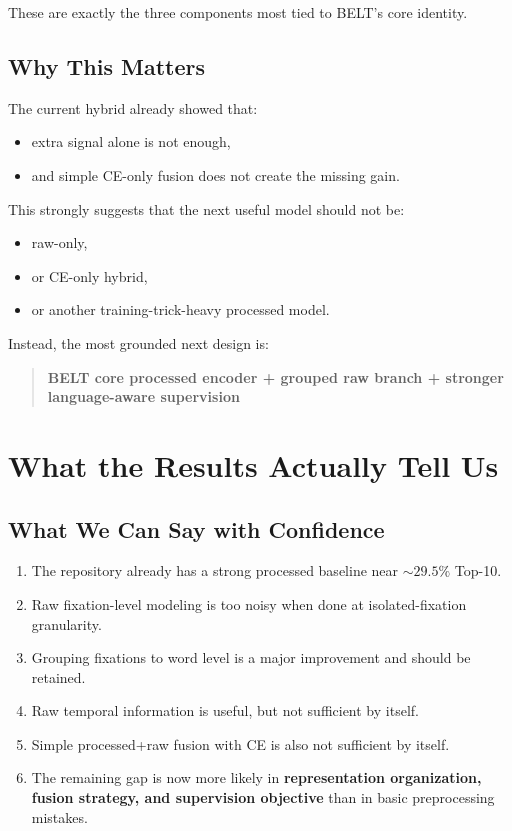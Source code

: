 \documentclass[11pt]{article}
\begin{document}
These are exactly the three components most tied to BELT's core identity.

\subsection{Why This Matters}

The current hybrid already showed that:
\begin{itemize}
    \item extra signal alone is not enough,
    \item and simple CE-only fusion does not create the missing gain.
\end{itemize}

This strongly suggests that the next useful model should not be:
\begin{itemize}
    \item raw-only,
    \item or CE-only hybrid,
    \item or another training-trick-heavy processed model.
\end{itemize}

Instead, the most grounded next design is:
\begin{quote}
\textbf{BELT core processed encoder + grouped raw branch + stronger language-aware supervision}
\end{quote}

\section{What the Results Actually Tell Us}

\subsection{What We Can Say with Confidence}

\begin{enumerate}
    \item The repository already has a strong processed baseline near \(\sim 29.5\%\) Top-10.
    \item Raw fixation-level modeling is too noisy when done at isolated-fixation granularity.
    \item Grouping fixations to word level is a major improvement and should be retained.
    \item Raw temporal information is useful, but not sufficient by itself.
    \item Simple processed+raw fusion with CE is also not sufficient by itself.
    \item The remaining gap is now more likely in \textbf{representation organization, fusion strategy, and supervision objective} than in basic preprocessing mistakes.
\end{enumerate}
\end{document}
